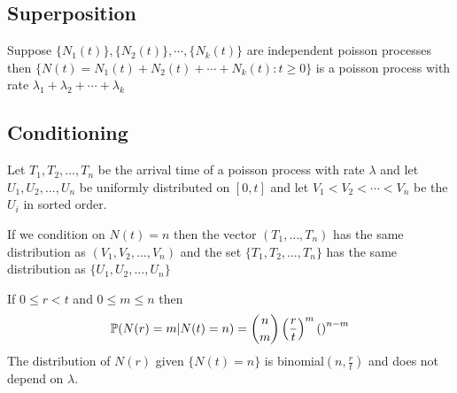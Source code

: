 \documentclass[12pt,a4paper]{article}
\begin{document}
\subsection{Superposition}
\begin{thm}[•]
    Suppose $\{N_1(t)\},\{N_2(t)\}, \cdots, \{N_k(t)\}$ are independent poisson processes then $\{N(t) = N_1(t) + N_2(t) + \cdots + N_k(t) : t\geq 0\}$ is a poisson process with rate $\lambda_1 + \lambda_2 + \cdots + \lambda_k$ 
\end{thm}
\newpage
\subsection{Conditioning}
Let $T_1, T_2, \ldots, T_n$ be the arrival time of a poisson process with rate $\lambda$ and let $U_1, U_2, \ldots, U_n$ be uniformly distributed on $[0,t]$ and let $V_1 < V_2 < \cdots < V_n$ be the $U_i$ in sorted order. 

\begin{thm}
    If we condition on $N(t) = n$ then the vector $(T_1, \ldots, T_n)$ has the same distribution as $(V_1, V_2, \ldots, V_n)$ and the set $\{T_1, T_2, \ldots, T_n\}$ has the same distribution as $\{U_1, U_2, \ldots, U_n\}$
\end{thm}
\begin{thm}
    If $0\leq r < t$ and $0\leq m \leq n$ then 
    \begin{align*}
        \P(N(r) = m | N(t) = n) = {n\choose m}\left(\frac{r}{t}\right)^m\left(\right)^{n-m}
    \end{align*}
    The distribution of $N(r)$ given $\{N(t) = n\}$ is  binomial$(n, \frac{r}{t})$ and does not depend on $\lambda$. 
\end{thm}
\end{document}
